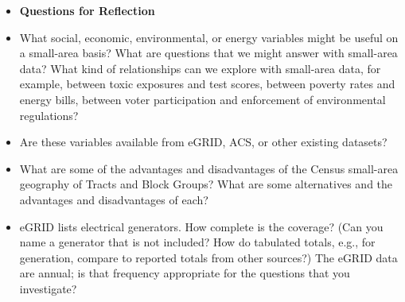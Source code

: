 \documentclass[fleqn, 12pt]{exam}
\begin{document}
    \begin{itemize}
  \item \textbf{Questions for Reflection}
  \item What social, economic, environmental, or energy variables might be useful on a small-area basis? What are questions that we might answer with small-area data? What kind of relationships can we explore with small-area data, for example, between toxic exposures and test scores, between poverty rates and energy bills, between voter participation and enforcement of environmental regulations?
  \item Are these variables available from eGRID, ACS, or other existing datasets?
  \item What are some of the advantages and disadvantages of the Census small-area geography of Tracts and Block Groups? What are some alternatives and the advantages and disadvantages of each?
  \item eGRID lists electrical generators.  How complete is the coverage? (Can you name a generator that is not included? How do tabulated totals, e.g., for generation, compare to reported totals from other sources?)  The eGRID data are annual; is that frequency appropriate for the questions that you investigate?
  \end{itemize}
  
\end{document}
